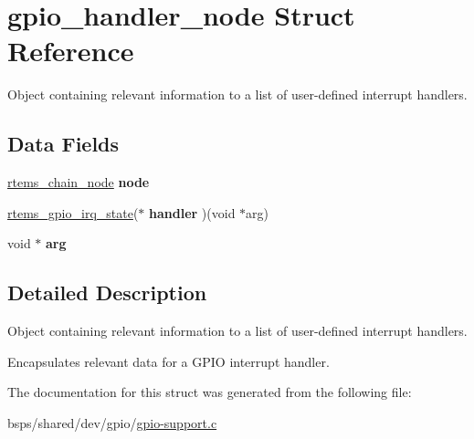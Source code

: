 \hypertarget{structgpio__handler__node}{}\section{gpio\+\_\+handler\+\_\+node Struct Reference}
\label{structgpio__handler__node}


Object containing relevant information to a list of user-\/defined interrupt handlers.  


\subsection*{Data Fields}
\begin{DoxyCompactItemize}
\item 
\mbox{\label{structgpio__handler__node_a47edc809486317d2a78ad34462312aff}} 
\mbox{\hyperlink{structChain__Node__struct}{rtems\+\_\+chain\+\_\+node}} {\bfseries node}
\item 
\mbox{\label{structgpio__handler__node_ae15e26484b06f077cdfd81554ef15363}} 
\mbox{\hyperlink{gpio_8h_a22ef6f3b12eae878a51eaf96f72437ea}{rtems\+\_\+gpio\+\_\+irq\+\_\+state}}($\ast$ {\bfseries handler} )(void $\ast$arg)
\item 
\mbox{\label{structgpio__handler__node_a1e3d791c4c0dc679c370e2c082ddc6c7}} 
void $\ast$ {\bfseries arg}
\end{DoxyCompactItemize}


\subsection{Detailed Description}
Object containing relevant information to a list of user-\/defined interrupt handlers. 

Encapsulates relevant data for a G\+P\+IO interrupt handler. 

The documentation for this struct was generated from the following file\+:\begin{DoxyCompactItemize}
\item 
bsps/shared/dev/gpio/\mbox{\hyperlink{gpio-support_8c}{gpio-\/support.\+c}}\end{DoxyCompactItemize}
